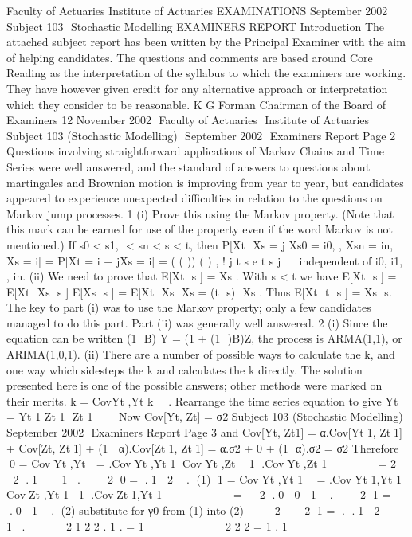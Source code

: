 \documentclass[a4paper,12pt]{article}
\begin{document}
\begin{enumerate}
Faculty of Actuaries Institute of Actuaries
EXAMINATIONS
September 2002
Subject 103  Stochastic Modelling
EXAMINERS REPORT
Introduction
The attached subject report has been written by the Principal Examiner with the aim of
helping candidates.  The questions and comments are based around Core Reading as the
interpretation of the syllabus to which the examiners are working.  They have however
given credit for any alternative approach or interpretation which they consider to be
reasonable.
K G Forman
Chairman of the Board of Examiners
12 November 2002
 Faculty of Actuaries
 Institute of Actuaries
Subject 103 (Stochastic Modelling)  September 2002  Examiners Report
Page 2
Questions involving straightforward applications of Markov Chains and Time Series were
well answered, and the standard of answers to questions about martingales and Brownian
motion is improving from year to year, but candidates appeared to experience unexpected
difficulties in relation to the questions on Markov jump processes.
1 (i) Prove this using the Markov property. (Note that this mark can be earned for
use of the property even if the word Markov is not mentioned.)
If s0 < s1,  < sn < s < t, then
P[Xt  Xs = j
Xs0 = i0, , Xsn = in, Xs = i]
= P[Xt = i + jXs = i] = ( ( )) ( ) ,
!
j
t s e t s
j
   
independent of i0, i1, , in.
(ii) We need to prove that E[Xt  s ] = Xs .
With s < t we have
E[Xt  s ] = E[Xt  Xs  s ] E[Xs  s ]
= E[Xt  Xs  Xs = (t  s)  Xs .
Thus E[Xt  t  s ] = Xs  s.
The key to part (i) was to use the Markov property; only a few candidates managed to do this
part. Part (ii) was generally well answered.
2 (i) Since the equation can be written (1  B) Y = (1 + (1  )B)Z, the process is
ARMA(1,1), or ARIMA(1,0,1).
(ii) There are a number of possible ways to calculate the k, and one way which
sidesteps the k and calculates the k directly. The solution presented here is
one of the possible answers; other methods were marked on their merits.
k = CovYt ,Yt k    .
Rearrange the time series equation to give Yt = Yt 1 Zt 1  Zt 1      
Now Cov[Yt, Zt] = σ2
Subject 103 (Stochastic Modelling)  September 2002  Examiners Report
Page 3
and Cov[Yt, Zt1] = α.Cov[Yt1, Zt1] + Cov[Zt, Zt1] + (1  α).Cov[Zt1, Zt1]
= α.σ2 + 0 + (1  α).σ2 = σ2
Therefore
0 = CovYt ,Yt  = .CovYt ,Yt 1 CovYt ,Zt  1 .CovYt ,Zt 1      
= 2   2
.1    1 .
   2
0 = .1  2  . (1)
1 = CovYt ,Yt 1 
= .CovYt 1,Yt 1 CovZt ,Yt 1 1 .CovZt 1,Yt 1     
   
=   2
.0  0  1  .
   2
1 = .0  1  . (2)
substitute for γ0 from (1) into (2)
    2    2
1 = . .1  2     1 .

    2
1 2
2 . 1 .
=
1
         	

2
2
2
= 1 .
1
    
       	 


\end{enumerate}
\end{document}
